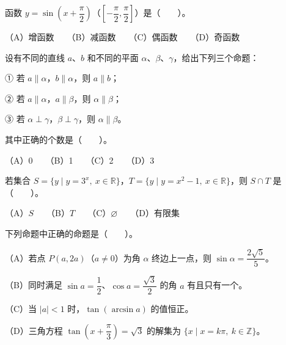 \begin{question}
函数 $y=\sin\left(x+\dfrac{\pi}{2}\right)$（$\left[-\dfrac{\pi}{2},\dfrac{\pi}{2}\right]$）是\mbox{（　　）}。

（A）增函数　　（B）减函数　　（C）偶函数　　（D）奇函数

\end{question}
\begin{question}
设有不同的直线 $a$、$b$ 和不同的平面 $\alpha$、$\beta$、$\gamma$，给出下列三个命题：

① 若 $a\parallel\alpha$，$b\parallel\alpha$，则 $a\parallel b$；

② 若 $a\parallel\alpha$，$a\parallel\beta$，则 $\alpha\parallel\beta$；

③ 若 $\alpha\perp\gamma$，$\beta\perp\gamma$，则 $\alpha\parallel\beta$。

其中正确的个数是\mbox{（　　）}。

（A）0　　（B）1　　（C）2　　（D）3

\end{question}
\begin{question}
若集合 $S=\{y\mid y=3^x,\ x\in\mathbb{R}\}$，$T=\{y\mid y=x^2-1,\ x\in\mathbb{R}\}$，则 $S\cap T$ 是\mbox{（　　）}。

（A）$S$　　（B）$T$　　（C）$\varnothing$　　（D）有限集

\end{question}
\begin{question}
下列命题中正确的命题是\mbox{（　　）}。

（A）若点 $P(a,2a)$（$a\neq 0$）为角 $\alpha$ 终边上一点，则 $\sin\alpha=\dfrac{2\sqrt{5}}{5}$。

（B）同时满足 $\sin a=\dfrac{1}{2}$、$\cos a=\dfrac{\sqrt{3}}{2}$ 的角 $a$ 有且只有一个。

（C）当 $|a|<1$ 时，$\tan(\arcsin a)$ 的值恒正。

（D）三角方程 $\tan\left(x+\dfrac{\pi}{3}\right)=\sqrt{3}$ 的解集为 $\{x\mid x=k\pi,\ k\in\mathbb{Z}\}$。

\end{question}

